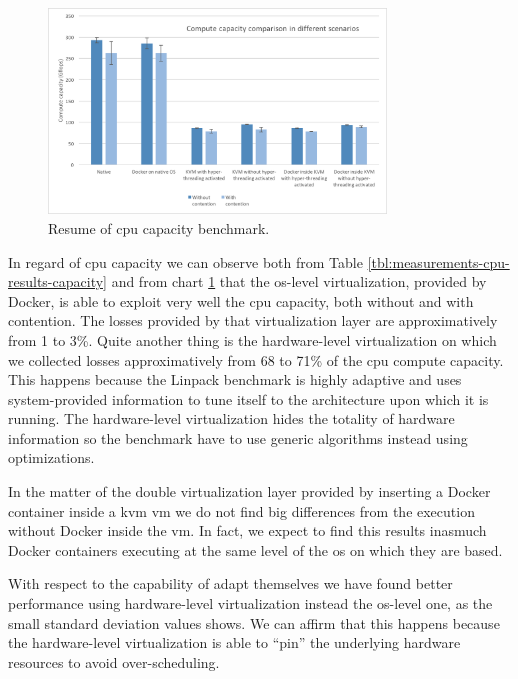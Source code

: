 \begin{figure}
	\centering{}
	\includegraphics[width=0.8\textwidth]{chapters/measurements/images/cpu-capacity.png}
	\caption[Compute - resume of capacity benchmark]{Resume of \acs{cpu} capacity benchmark.}
	\label{img:measurements-cpu-results-capacity}
\end{figure}

In regard of \acs{cpu} capacity we can observe both from Table \ref{tbl:measurements-cpu-results-capacity}
and from chart \ref{img:measurements-cpu-results-capacity} that the \acs{os}-level virtualization,
provided by Docker, is able to exploit very well the \acs{cpu} capacity, both without and with contention.
The losses provided by that virtualization layer are approximatively from 1 to 3\%. Quite another thing is
the  hardware-level virtualization on which we collected losses approximatively from 68 to 71\% of the
\acs{cpu} compute capacity. This happens because the Linpack benchmark is highly adaptive and uses
system-provided information to tune itself to the architecture upon which it is running. The hardware-level
virtualization hides the totality of hardware information so the benchmark have to use generic algorithms
instead using optimizations.

In the matter of the double virtualization layer provided by inserting a Docker container inside a
\ac{kvm} \ac{vm} we do not find big differences from the execution without Docker inside the \ac{vm}.
In fact, we expect to find this results inasmuch Docker containers executing at the same level
of the \acs{os} on which they are based.

With respect to the capability of adapt themselves we have found better performance using
hardware-level virtualization instead the \acs{os}-level one, as the small standard deviation values
shows. We can affirm that this happens because the hardware-level virtualization is able to ``pin''
the underlying hardware resources to avoid over-scheduling.


